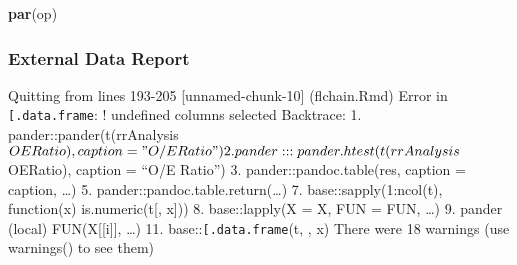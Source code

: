 \documentclass[
]{article}
\newenvironment{Shaded}{\begin{snugshade}}{\end{snugshade}}
\newcommand{\AttributeTok}[1]{\textcolor[rgb]{0.13,0.29,0.53}{#1}}
\newcommand{\FunctionTok}[1]{\textcolor[rgb]{0.13,0.29,0.53}{\textbf{#1}}}
\newcommand{\NormalTok}[1]{#1}
\newcommand{\SpecialCharTok}[1]{\textcolor[rgb]{0.81,0.36,0.00}{\textbf{#1}}}
\newcommand{\StringTok}[1]{\textcolor[rgb]{0.31,0.60,0.02}{#1}}
\begin{document}
\begin{Shaded}
\begin{Highlighting}[]
\FunctionTok{par}\NormalTok{(op)}
\end{Highlighting}
\end{Shaded}

\hypertarget{external-data-report}{%
\subsubsection{External Data Report}\label{external-data-report}}

\begin{Shaded}
\end{Shaded}

Quitting from lines 193-205 {[}unnamed-chunk-10{]} (flchain.Rmd) Error
in \texttt{{[}.data.frame}: ! undefined columns selected Backtrace: 1.
pander::pander(t(rrAnalysis\(OERatio), caption = "O/E Ratio")  2. pander:::pander.htest(t(rrAnalysis\)OERatio),
caption = ``O/E Ratio'') 3. pander::pandoc.table(res, caption = caption,
\ldots) 5. pander::pandoc.table.return(\ldots) 7.
base::sapply(1:ncol(t), function(x) is.numeric(t{[}, x{]})) 8.
base::lapply(X = X, FUN = FUN, \ldots) 9. pander (local)
FUN(X{[}{[}i{]}{]}, \ldots) 11. base::\texttt{{[}.data.frame}(t, , x)
There were 18 warnings (use warnings() to see them)

\begin{Shaded}
\end{Shaded}
\end{document}
